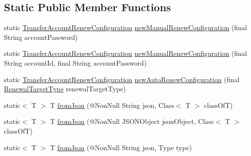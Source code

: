 \subsection*{Static Public Member Functions}
\begin{DoxyCompactItemize}
\item 
static \hyperlink{classcom_1_1toast_1_1android_1_1gamebase_1_1auth_1_1transfer_1_1data_1_1_transfer_account_renew_configuration}{Transfer\+Account\+Renew\+Configuration} \hyperlink{classcom_1_1toast_1_1android_1_1gamebase_1_1auth_1_1transfer_1_1data_1_1_transfer_account_renew_configuration_a37352c6a16016b50bc9aacf83396cf18}{new\+Manual\+Renew\+Configuration} (final String account\+Password)
\item 
static \hyperlink{classcom_1_1toast_1_1android_1_1gamebase_1_1auth_1_1transfer_1_1data_1_1_transfer_account_renew_configuration}{Transfer\+Account\+Renew\+Configuration} \hyperlink{classcom_1_1toast_1_1android_1_1gamebase_1_1auth_1_1transfer_1_1data_1_1_transfer_account_renew_configuration_a0ecf179bdc49a22aebe2a18452550459}{new\+Manual\+Renew\+Configuration} (final String account\+Id, final String account\+Password)
\item 
static \hyperlink{classcom_1_1toast_1_1android_1_1gamebase_1_1auth_1_1transfer_1_1data_1_1_transfer_account_renew_configuration}{Transfer\+Account\+Renew\+Configuration} \hyperlink{classcom_1_1toast_1_1android_1_1gamebase_1_1auth_1_1transfer_1_1data_1_1_transfer_account_renew_configuration_a9b5fd993da8414a0b33cd2e52fd2764b}{new\+Auto\+Renew\+Configuration} (final \hyperlink{enumcom_1_1toast_1_1android_1_1gamebase_1_1auth_1_1transfer_1_1data_1_1_renewal_target_type}{Renewal\+Target\+Type} renewal\+Target\+Type)
\item 
static$<$ T $>$ T \hyperlink{classcom_1_1toast_1_1android_1_1gamebase_1_1base_1_1_value_object_ae6655c88c20a9a8406dc11b46250ac7b}{from\+Json} (@Non\+Null String json, Class$<$ T $>$ class\+OfT)
\item 
static$<$ T $>$ T \hyperlink{classcom_1_1toast_1_1android_1_1gamebase_1_1base_1_1_value_object_ab83c4196ee2e3f11553bbe0f04dc2101}{from\+Json} (@Non\+Null J\+S\+O\+N\+Object json\+Object, Class$<$ T $>$ class\+OfT)
\item 
static$<$ T $>$ T \hyperlink{classcom_1_1toast_1_1android_1_1gamebase_1_1base_1_1_value_object_aa901d97d495150b54bcb80c05672f58a}{from\+Json} (@Non\+Null String json, Type type)
\end{DoxyCompactItemize}


